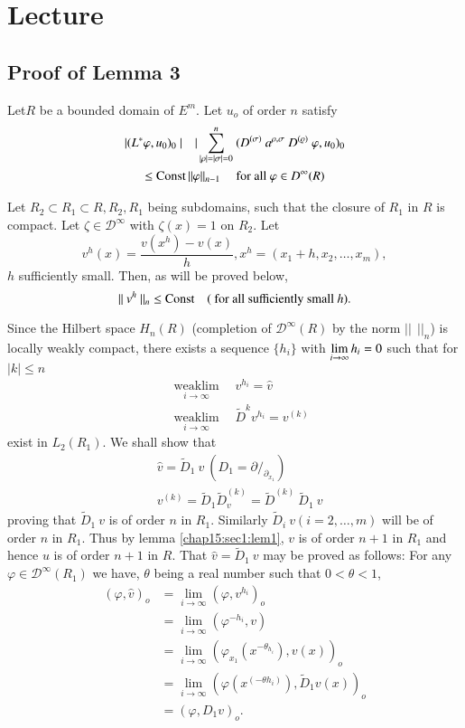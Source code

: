 \chapter{Lecture}\label{chap16} %

\section{Proof of Lemma 3}\label{chap16:sec1}

 Let\pageoriginale $R$ be a bounded domain of $E^m$. Let $u_o$ of order $n$ satisfy
 \begin{gather*}
 | (L^* \varphi, u_0)_0 ~ | \quad |\sum_{| \rho | = |
   \sigma | = 0}^{n} ~
 (D^{(\sigma)} ~ a^{\rho,\sigma} ~ D^{(\varrho)} ~ \varphi, u_0)_0\\
 \le \operatorname{Const} || \varphi ||_{n-1}\quad \text{ for all } \varphi \in D^\infty (R) 
 \end{gather*}

Let $R_2 \subset R_1 \subset R, R_2, R_1$ being subdomains, such that
the closure of $R_1$ in $R$ is compact. Let $\zeta \in
\mathscr{D}^\infty$ with $\zeta (x) = 1$ on $R_2$. Let 
$$
v^h(x) = \frac{v(x^h) - v(x)}{h}, x^h = (x_1 + h, x_2, \ldots, x_m),
$$
$h$ sufficiently small. Then, as will be proved below,
$$
|| ~ v^h ~ ||_n \le \operatorname{Const} \quad (\text{ for all sufficiently small } h).
$$

Since the Hilbert space $H_n (R)$ (completion of $\mathscr{D}^\infty
(R)$ by the norm $|| ~~ ||_n$) is locally weakly compact, there exists
a sequence $\{h_i \}$ with $\lim\limits_{i \rightarrow \infty }\break h_i
= 0$ such that for $ | k | \le n$ 
\begin{align*}
 & \underset{i \rightarrow \infty}{\text{weak}\lim\limits} \quad v^{h_i}
 = \hat{v}\\ 
 & \underset{i \rightarrow \infty}{\text{weak}\lim\limits} \quad
 \tilde{D}^k v^{h_i} = v^{(k)} 
\end{align*}
exist in $L_2(R_1)$. We shall show that 
\begin{align*}
 & \hat{v} = \tilde{D}_1 ~ v ~ (D_1 = \partial/_{\partial_{x_1}})\\
 & v^{(k)} = \tilde{D}_1 \tilde{D}^{(k)}_v = \tilde{D}^{(k)} ~
 \tilde{D}_1 ~ v 
\end{align*}
proving that $\tilde{D}_1 ~ v$ is of order $n$ in $R_1$. Similarly
$\tilde{D}_i ~ v (i = 2, \ldots, m)$ will be of order $n$ in
$R_1$. Thus by lemma \ref{chap15:sec1:lem1}, $v$ is of order $n + 1$ in $R_1$ and hence
$u$ is of order $n + 1$ in $R$. That $\hat{v} = \tilde{D}_1 ~ v$ may
be proved as follows: For any $\varphi \in \mathscr{D}^\infty(R_1)$ we
have, $\theta$ being a real number such that $0 < \theta < 1$, 
\begin{align*}
 (\varphi, \hat{v})_o & = \lim_{i \rightarrow \infty} (\varphi, v^{h_i})_o\\
 & = \lim_{i \rightarrow \infty} (\varphi^{-h_i}, v)\\
 & = \lim_{i \rightarrow \infty} (\varphi_{x_1} (x^{-\theta_{h_i}}), v(x))_o\\
 & = \lim_{i \rightarrow \infty} (\varphi(x^{(-\theta h_i)}), \tilde{D}_1 v(x))_o\\
 & = (\varphi, D_1 v)_o.
\end{align*}

